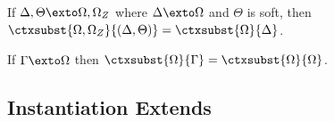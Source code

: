 \begin{lemma}
  If $\Delta, \Theta \exto \Omega, \Omega_Z$ where $\Delta \exto \Omega$ and $\Theta$ is soft, then $\ctxsubst{\Omega, \Omega_Z}{(\Delta, \Theta)} = \ctxsubst{\Omega}{\Delta}$.
  \label{lemma:subst_go_away}
\end{lemma}

\begin{lemma}
  If $\Gamma \exto \Omega$ then $\ctxsubst{\Omega}{\Gamma} = \ctxsubst{\Omega}{\Omega}$.
  \label{lemma:stable_complete_ctxt}
\end{lemma}



\subsection{Instantiation Extends}

